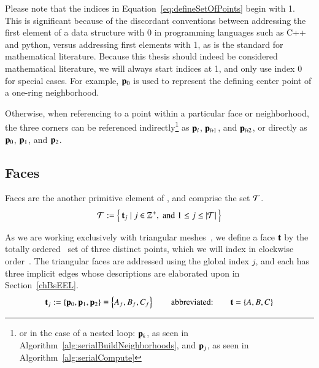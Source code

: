 Please note that the indices in Equation~\ref{eq:defineSetOfPoints} begin with 1. This is significant because of the discordant conventions between addressing the first element of a data structure with 0 in programming languages such as C++ and python, versus addressing first elements with 1, as is the standard for mathematical literature. Because this thesis should indeed be considered mathematical literature, we will always start indices at 1, and only use index 0 for special cases. For example, $\mathbf{p}_0$ is used to represent the defining center point of a one-ring neighborhood.

Otherwise,
 when referencing to a point within a particular face or neighborhood, the three corners can be referenced indirectly\footnote{or in the case of a nested loop: $\mathbf{p}_k$, as seen in Algorithm~\ref{alg:serialBuildNeighborhoods}, and $\mathbf{p}_j$, as seen in Algorithm~\ref{alg:serialCompute}} as $\mathbf{p}_i$, $\bp_{\sipo}$, and $\bp_{\sipt}$, or directly as $\mathbf{p}_0$, $\mathbf{p}_1$, and $\mathbf{p}_2$.%
%
%
~\cite[p.~25]{Mara12}%
%
\subsection{Faces}
\label{ch2s3ssF}
Faces are the another primitive element of \tdd{}, and comprise the set $\mathcal{T}$.
\begin{equation}
	\mathcal{T} := \left \{\:\mathbf{t}_j \mid j \in \mathbb{Z}^+, \;\text{and}\; 1\leq j \leq|\mathcal{T}|\:\right \}
	\label{eq:defineSetOfFaces}
\end{equation}%
%
%
%

As we are working exclusively with triangular meshes~\cite[p.~26]{Mara12}, we define a face $\mathbf{t}$ by the totally ordered~\cite{Weisstein19a} set of three distinct points, which we will index in clockwise order~\cite[p.~4]{Mara17}. The triangular faces are addressed using the global index $j$, and each has three implicit edges whose descriptions are elaborated upon in Section~\ref{chBsEEL}.
\begin{equation}
	\mathbf{t}_j := \left \{\mathbf{p}_0, \mathbf{p}_1, \mathbf{p}_2\right \} \equiv \left \{A_f, B_f, C_f\right \} \hspace{20pt}\text{abbreviated:}\hspace{20pt} \mathbf{t} = \left \{A, B, C\right \}
	\label{eq:defineSetOfFaces}
\end{equation}%
%

